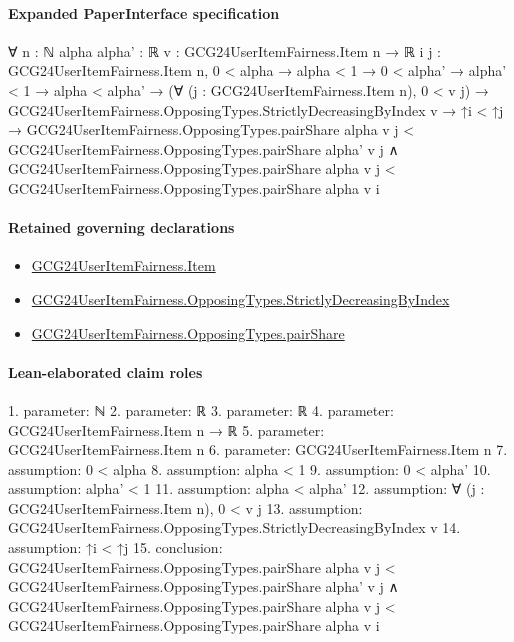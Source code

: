 \documentclass[10pt]{article}
\begin{document}
\paragraph{Expanded PaperInterface specification}
\begin{ReviewVerbatim}
∀ {n : ℕ} {alpha alpha' : ℝ} {v : GCG24UserItemFairness.Item n → ℝ} {i j : GCG24UserItemFairness.Item n},
  0 < alpha →
    alpha < 1 →
      0 < alpha' →
        alpha' < 1 →
          alpha < alpha' →
            (∀ (j : GCG24UserItemFairness.Item n), 0 < v j) →
              GCG24UserItemFairness.OpposingTypes.StrictlyDecreasingByIndex v →
                ↑i < ↑j →
                  GCG24UserItemFairness.OpposingTypes.pairShare alpha v j <
                      GCG24UserItemFairness.OpposingTypes.pairShare alpha' v j ∧
                    GCG24UserItemFairness.OpposingTypes.pairShare alpha v j <
                      GCG24UserItemFairness.OpposingTypes.pairShare alpha v i
\end{ReviewVerbatim}

\paragraph{Retained governing declarations}
\begin{itemize}\raggedright
\item \hyperlink{governing-declaration-a7c560a429c6e204}{GCG24\allowbreak{}User\allowbreak{}Item\allowbreak{}Fairness.\allowbreak{}Item}
\item \hyperlink{governing-declaration-8278344d2ddef9a8}{GCG24\allowbreak{}User\allowbreak{}Item\allowbreak{}Fairness.\allowbreak{}Opposing\allowbreak{}Types.\allowbreak{}Strictly\allowbreak{}Decreasing\allowbreak{}By\allowbreak{}Index}
\item \hyperlink{governing-declaration-1663e30d856ccba9}{GCG24\allowbreak{}User\allowbreak{}Item\allowbreak{}Fairness.\allowbreak{}Opposing\allowbreak{}Types.\allowbreak{}pair\allowbreak{}Share}
\end{itemize}
\paragraph{Lean-elaborated claim roles}\begin{ReviewVerbatim}
1. parameter: ℕ
2. parameter: ℝ
3. parameter: ℝ
4. parameter: GCG24UserItemFairness.Item n → ℝ
5. parameter: GCG24UserItemFairness.Item n
6. parameter: GCG24UserItemFairness.Item n
7. assumption: 0 < alpha
8. assumption: alpha < 1
9. assumption: 0 < alpha'
10. assumption: alpha' < 1
11. assumption: alpha < alpha'
12. assumption: ∀ (j : GCG24UserItemFairness.Item n), 0 < v j
13. assumption: GCG24UserItemFairness.OpposingTypes.StrictlyDecreasingByIndex v
14. assumption: ↑i < ↑j
15. conclusion: GCG24UserItemFairness.OpposingTypes.pairShare alpha v j < GCG24UserItemFairness.OpposingTypes.pairShare alpha' v j ∧
  GCG24UserItemFairness.OpposingTypes.pairShare alpha v j < GCG24UserItemFairness.OpposingTypes.pairShare alpha v i
\end{ReviewVerbatim}
\end{document}
